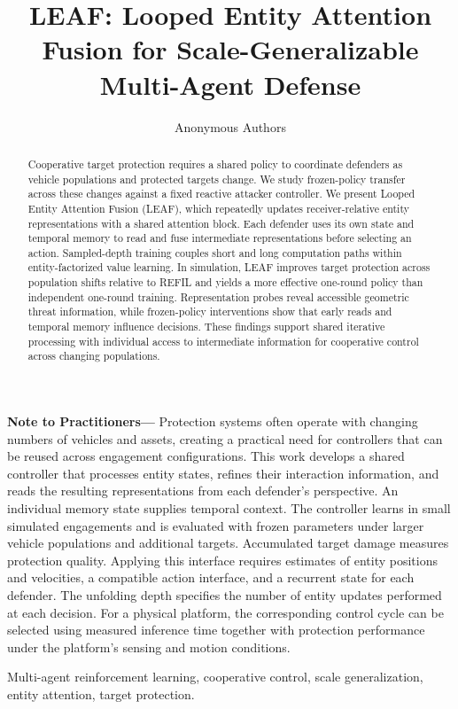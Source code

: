 \documentclass[journal,10pt]{IEEEtran}
\begin{document}
\title{LEAF: Looped Entity Attention Fusion for Scale-Generalizable Multi-Agent Defense}
\author{Anonymous Authors}
\maketitle
{}
\begin{abstract}
Cooperative target protection requires a shared policy to coordinate defenders as vehicle populations and protected targets change. We study frozen-policy transfer across these changes against a fixed reactive attacker controller. We present Looped Entity Attention Fusion (LEAF), which repeatedly updates receiver-relative entity representations with a shared attention block. Each defender uses its own state and temporal memory to read and fuse intermediate representations before selecting an action. Sampled-depth training couples short and long computation paths within entity-factorized value learning. In simulation, LEAF improves target protection across population shifts relative to REFIL and yields a more effective one-round policy than independent one-round training. Representation probes reveal accessible geometric threat information, while frozen-policy interventions show that early reads and temporal memory influence decisions. These findings support shared iterative processing with individual access to intermediate information for cooperative control across changing populations.
\end{abstract}
\noindent\textbf{Note to Practitioners---}
Protection systems often operate with changing numbers of vehicles and assets, creating a practical need for controllers that can be reused across engagement configurations. This work develops a shared controller that processes entity states, refines their interaction information, and reads the resulting representations from each defender's perspective. An individual memory state supplies temporal context. The controller learns in small simulated engagements and is evaluated with frozen parameters under larger vehicle populations and additional targets. Accumulated target damage measures protection quality. Applying this interface requires estimates of entity positions and velocities, a compatible action interface, and a recurrent state for each defender. The unfolding depth specifies the number of entity updates performed at each decision. For a physical platform, the corresponding control cycle can be selected using measured inference time together with protection performance under the platform's sensing and motion conditions.
\begin{IEEEkeywords}
Multi-agent reinforcement learning, cooperative control, scale generalization, entity attention, target protection.
\end{IEEEkeywords}
\end{document}
